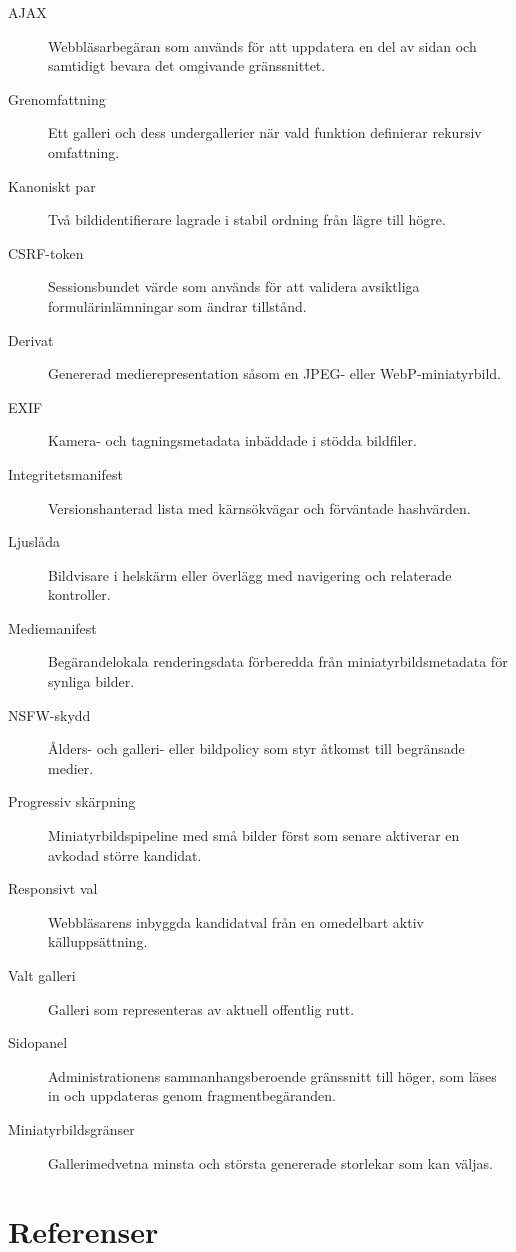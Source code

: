 \documentclass[11pt,a4paper]{article}
\begin{document}
\begin{description}
  \item[AJAX] Webbläsarbegäran som används för att uppdatera en del av sidan och
  samtidigt bevara det omgivande gränssnittet.
  \item[Grenomfattning] Ett galleri och dess undergallerier när vald funktion
  definierar rekursiv omfattning.
  \item[Kanoniskt par] Två bildidentifierare lagrade i stabil ordning från lägre
  till högre.
  \item[CSRF-token] Sessionsbundet värde som används för att validera avsiktliga
  formulärinlämningar som ändrar tillstånd.
  \item[Derivat] Genererad medierepresentation såsom en JPEG- eller
  WebP-miniatyrbild.
  \item[EXIF] Kamera- och tagningsmetadata inbäddade i stödda bildfiler.
  \item[Integritetsmanifest] Versionshanterad lista med kärnsökvägar och
  förväntade hashvärden.
  \item[Ljuslåda] Bildvisare i helskärm eller överlägg med navigering och
  relaterade kontroller.
  \item[Mediemanifest] Begärandelokala renderingsdata förberedda från
  miniatyrbildsmetadata för synliga bilder.
  \item[NSFW-skydd] Ålders- och galleri- eller bildpolicy som styr åtkomst till
  begränsade medier.
  \item[Progressiv skärpning] Miniatyrbildspipeline med små bilder först som
  senare aktiverar en avkodad större kandidat.
  \item[Responsivt val] Webbläsarens inbyggda kandidatval från en omedelbart
  aktiv källuppsättning.
  \item[Valt galleri] Galleri som representeras av aktuell offentlig rutt.
  \item[Sidopanel] Administrationens sammanhangsberoende gränssnitt till höger,
  som läses in och uppdateras genom fragmentbegäranden.
  \item[Miniatyrbildsgränser] Gallerimedvetna minsta och största genererade
  storlekar som kan väljas.
\end{description}

\clearpage
\section{Referenser}
\label{sec:references}
\end{document}
